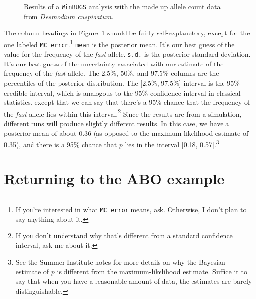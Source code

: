 \documentclass[12pt]{article}
\begin{document}
\begin{figure}
\begin{center}
\end{center}
\caption{Results of a {\tt WinBUGS} analysis with the made up allele
  count data from {\it Desmodium cuspidatum}.}
\label{fig:binomial-results}
\end{figure}

The column headings in Figure~\ref{fig:binomial-results} should be
fairly self-explanatory, except for the one labeled {\tt MC
  error}.\footnote{If you're interested in what {\tt MC error} means,
  ask. Otherwise, I don't plan to say anything about it.} {\tt mean}
is the posterior mean. It's our best guess of the value for the
frequency of the {\it fast\/} allele. {\tt s.d.} is the posterior
standard deviation. It's our best guess of the uncertainty associated
with our estimate of the frequency of the {\it fast\/} allele. The
2.5\%, 50\%, and 97.5\% columns are the percentiles of the posterior
distribution. The [2.5\%, 97.5\%] interval is the 95\% credible
interval, which is analogous to the 95\% confidence interval in
classical statistics, except that we can say that there's a 95\%
chance that the frequency of the {\it fast\/} allele lies within this
interval.\footnote{If you don't understand why that's different from a
  standard confidence interval, ask me about it.} Since the results
are from a simulation, different runs will produce slightly different
results. In this case, we have a posterior mean of about 0.36 (as
opposed to the maximum-likelihood estimate of 0.35), and there is a
95\% chance that $p$ lies in the interval [0.18, 0.57].\footnote{See
  the Summer Institute notes for more details on why the Bayesian
  estimate of $p$ is different from the maximum-likelihood
  estimate. Suffice it to say that when you have a reasonable amount
  of data, the estimates are barely distinguishable.}

\section*{Returning to the ABO example}
\end{document}
